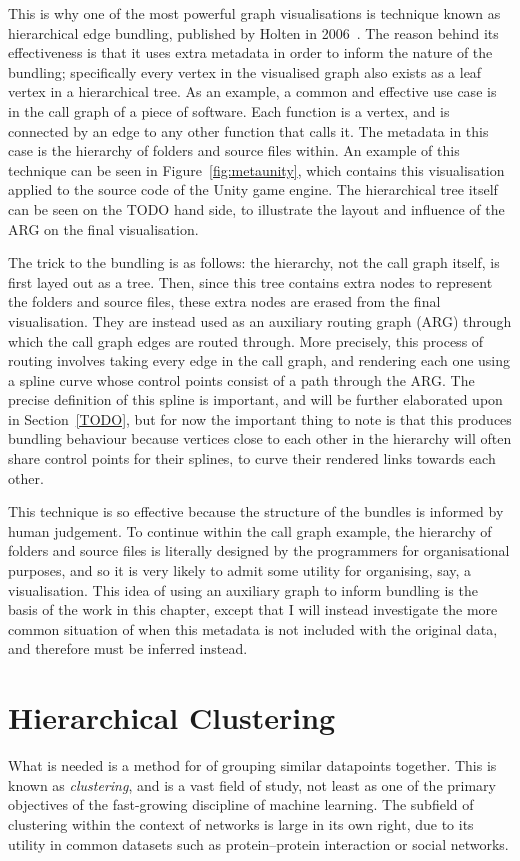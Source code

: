 This is why one of the most powerful graph visualisations is technique known as hierarchical edge bundling, published by Holten in 2006~\cite{Holten2006}. The reason behind its effectiveness is that it uses extra metadata in order to inform the nature of the bundling; specifically every vertex in the visualised graph also exists as a leaf vertex in a hierarchical tree. As an example, a common and effective use case is in the call graph of a piece of software. Each function is a vertex, and is connected by an edge to any other function that calls it. The metadata in this case is the hierarchy of folders and source files within.
An example of this technique can be seen in Figure~\ref{fig:metaunity}, which contains this visualisation applied to the source code of the Unity game engine. The hierarchical tree itself can be seen on the TODO hand side, to illustrate the layout and influence of the ARG on the final visualisation. 

The trick to the bundling is as follows: the hierarchy, not the call graph itself, is first layed out as a tree. Then, since this tree contains extra nodes to represent the folders and source files, these extra nodes are erased from the final visualisation. They are instead used as an auxiliary routing graph (ARG) through which the call graph edges are routed through.
More precisely, this process of routing involves taking every edge in the call graph, and rendering each one using a spline curve whose control points consist of a path through the ARG. The precise definition of this spline is important, and will be further elaborated upon in Section~\ref{TODO}, but for now the important thing to note is that this produces bundling behaviour because vertices close to each other in the hierarchy will often share control points for their splines, to curve their rendered links towards each other.

This technique is so effective because the structure of the bundles is informed by human judgement. To continue within the call graph example, the hierarchy of folders and source files is literally designed by the programmers for organisational purposes, and so it is very likely to admit some utility for organising, say, a visualisation.
This idea of using an auxiliary graph to inform bundling is the basis of the work in this chapter, except that I will instead investigate the more common situation of when this metadata is not included with the original data, and therefore must be inferred instead.

\section{Hierarchical Clustering}
What is needed is a method for of grouping similar datapoints together. This is known as \textit{clustering}, and is a vast field of study, not least as one of the primary objectives of the fast-growing discipline of machine learning. The subfield of clustering within the context of networks is large in its own right, due to its utility in common datasets such as protein--protein interaction or social networks.

